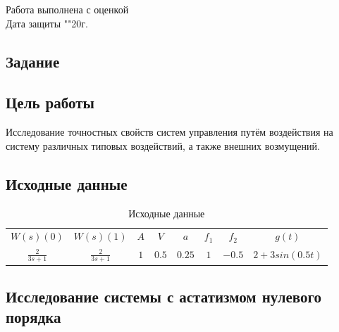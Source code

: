 \documentclass[a4paper, 11pt]{article}
\begin{document}
\begin{titlepage}
		Работа выполнена с оценкой \hspace{1cm} \underline{\hspace{8cm}} \\ 
		\vspace{1cm}
		Дата защиты "\underline{\hspace{0.7cm}}"\hspace{0.2cm}\underline{\hspace{2cm}}\hspace{0.2cm}20\underline{\hspace{0.7cm}}г.

\end{titlepage}


\begin{center}
\section*{Задание}
\end{center}
\subsection*{Цель работы}
Исследование точностных свойств систем управления путём воздействия на систему различных типовых воздействий, а также внешних возмущений. 

\subsection*{Исходные данные}
\begin{table}[h!]
\centering
\begin{threeparttable}
\caption{Исходные данные}\label{tab:perflogcross}
\begin{tabular}{|c|c|c|c|c|c|c|c|}
\hline
$W(s)(0)$ & $W(s)(1)$ & $A$ & $V$ & $a$ & $f_1$ & $f_2$ & $g(t)$\\
\cline{1-8}
\rule{0cm}{0.75cm}
\(\displaystyle \frac{2}{3s+1}\) & \(\displaystyle \frac{2}{3s+1}\) & $1$ & $0.5$ & $0.25$ & $1$ & $-0.5$ & $2+3sin(0.5t)$\\[0.4cm]
\hline

\end{tabular}
\end{threeparttable}
\end{table}

\newpage
\begin{center}
\section{Исследование системы с астатизмом нулевого порядка}
\end{center}
\end{document}
